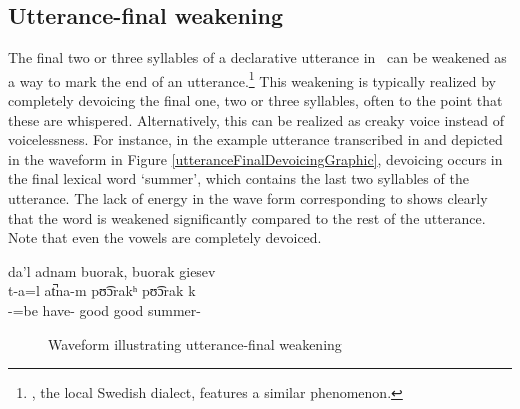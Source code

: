 \subsection{Utterance-final weakening}\label{utteranceFinalDevoicing}
The final two or three syllables of a declarative utterance in \PS\ can be weakened as a way to mark the end of an utterance.\footnote{, the local Swedish dialect, features a similar phenomenon.} 
This weakening is typically realized by completely devoicing the final one, two or three syllables, often to the point that these are whispered. Alternatively, this can be realized as creaky voice instead of voicelessness. For instance, in the example utterance transcribed in  and depicted in the waveform in Figure \vref{utteranceFinalDevoicingGraphic}, devoicing occurs in the final lexical word  ‘summer’, which contains the last two syllables of the utterance. 
The lack of energy in the wave form corresponding to  shows clearly that the word is weakened significantly compared to the rest of the utterance. Note that even the vowels are completely devoiced.

\ea\label{utteranceFinalDevoicing1}%
\glll	da’l adnam buorak, buorak giesev\\
	t-a=l at̚na-m pʊ͡ɔrakʰ pʊ͡ɔrak k\\
	-=be\BS{} have- good good summer-\\\nopagebreak
{} 
\z
\begin{figure}
\caption{Waveform illustrating utterance-final weakening}\label{utteranceFinalDevoicingGraphic}
\end{figure}

